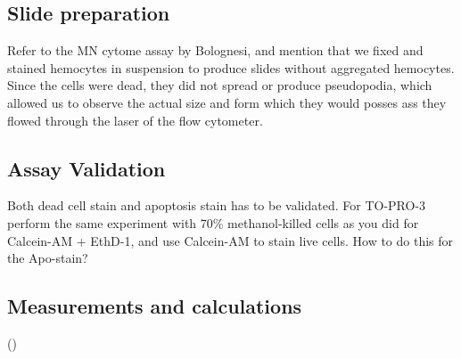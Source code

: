 \subsection{Slide preparation}
Refer to the MN cytome assay by Bolognesi, and mention that we fixed and stained hemocytes in suspension to produce slides without aggregated hemocytes. Since the cells were dead, they did not spread or produce pseudopodia, which allowed us to observe the actual size and form which they would posses ass they flowed through the laser of the flow cytometer.

\subsection{Assay Validation}
Both dead cell stain and apoptosis stain has to be validated. For TO-PRO-3 perform the same experiment with 70\% methanol-killed cells as you did for Calcein-AM + EthD-1, and use Calcein-AM to stain live cells.
How to do this for the Apo-stain?

\subsection{Measurements and calculations}
(\cite{R-project})